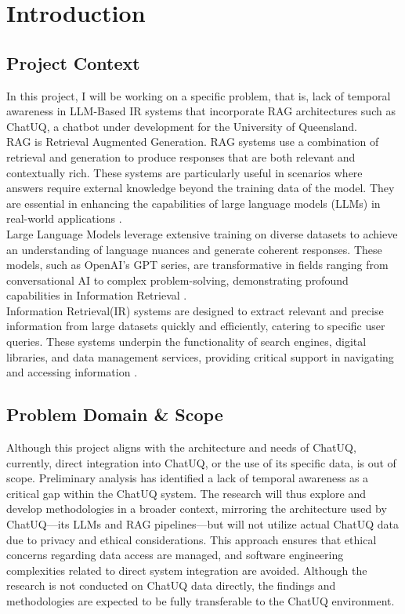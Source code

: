 \section{Introduction}

\subsection{Project Context}

In this project, I will be working on a specific problem, that is, lack of temporal awareness in LLM-Based IR systems that incorporate RAG architectures such as ChatUQ, a chatbot under development for the University of Queensland. \\

RAG is Retrieval Augmented Generation. RAG systems use a combination of retrieval and generation to produce responses that are both relevant and contextually rich. These systems are particularly useful in scenarios where answers require external knowledge beyond the training data of the model. They are essential in enhancing the capabilities of large language models (LLMs) in real-world applications \parencite{lewis2020retrieval}. \\

Large Language Models leverage extensive training on diverse datasets to achieve an understanding of language nuances and generate coherent responses. These models, such as OpenAI's GPT series, are transformative in fields ranging from conversational AI to complex problem-solving, demonstrating profound capabilities in Information Retrieval \parencite{naveed2023comprehensive}. \\

Information Retrieval(IR) systems are designed to extract relevant and precise information from large datasets quickly and efficiently, catering to specific user queries. These systems underpin the functionality of search engines, digital libraries, and data management services, providing critical support in navigating and accessing information \parencite{zhu2023large}.

\subsection{Problem Domain \& Scope}

Although this project aligns with the architecture and needs of ChatUQ, currently, direct integration into ChatUQ, or the use of its specific data, is out of scope. Preliminary analysis has identified a lack of temporal awareness as a critical gap within the ChatUQ system. The research will thus explore and develop methodologies in a broader context, mirroring the architecture used by ChatUQ—its LLMs and RAG pipelines—but will not utilize actual ChatUQ data due to privacy and ethical considerations. This approach ensures that ethical concerns regarding data access are managed, and software engineering complexities related to direct system integration are avoided. Although the research is not conducted on ChatUQ data directly, the findings and methodologies are expected to be fully transferable to the ChatUQ environment.

